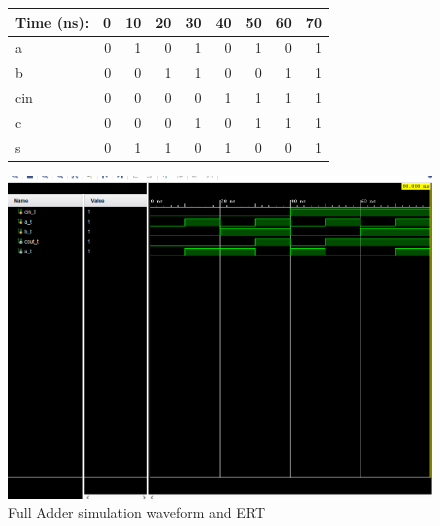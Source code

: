 \documentclass[11pt]{article}
\begin{document}
\begin{figure}[ht]\centering
	\begin{tabular}{l|rrrrrrrr}
		Time (ns): & 0 & 10 & 20 & 30 & 40 & 50 & 60 & 70 \\
		\midrule 
		a &  0 & 1 & 0 & 1 & 0 & 1 & 0 & 1 \\
		b & 0 & 0 & 1 & 1 & 0 & 0 & 1 & 1\\
		cin & 0 & 0 & 0 & 0 & 1 & 1 & 1 & 1 \\
		\midrule
		c & 0 & 0 & 0 & 1 & 0 & 1 & 1 & 1 \\
		s & 0 & 1 & 1 & 0 & 1 & 0 & 0 & 1 \\ \bottomrule
	\end{tabular}\medskip
	
	\includegraphics[width=1.0\textwidth]{FullAdderWaveReal}
	\caption{Full Adder simulation waveform and ERT}
	\label{fig:sim_with_table}
\end{figure}

\clearpage
\end{document}
